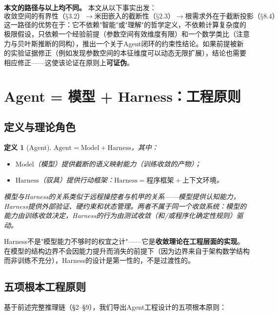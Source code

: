 \documentclass[11pt,a4paper]{ctexart}
\newtheorem{definition}[theorem]{定义}
\begin{document}
\textbf{本文的路径与以上均不同。} 本文从以下事实出发：
\[
\text{收敛空间的有界性（§3.2）} \longrightarrow \text{米田嵌入的截断性（§2.3）} \longrightarrow \text{根需求外在于截断投影（§8.4）}
\]
这一路径的优势在于：它不依赖"智能"或"理解"的哲学定义，不依赖计算复杂度的极限假设，只依赖一个经验前提（参数空间有效维度有限）和一个数学类比（注意力与贝叶斯推断的同构），推出一个关于Agent闭环的约束性结论。如果前提被新的实验证据修正（例如发现参数空间的本征维度可以动态无限扩展），结论也需要相应修正——这使该论证在原则上\textbf{可证伪}。


\section{Agent = 模型 + Harness：工程原则}

\subsection{定义与理论角色}

\begin{definition}[Agent]
    $\mathrm{Agent} = \mathrm{Model} + \mathrm{Harness}$，其中：
    \begin{itemize}
        \item $\mathrm{Model}$（模型）提供截断的语义映射能力（训练收敛的产物）；
        \item $\mathrm{Harness}$（驭具）提供行动框架：$\mathrm{Harness} = \mathrm{程序框架} + \mathrm{上下文环境}$。
    \end{itemize}
    模型与Harness的关系类似于远程操控者与机甲的关系——模型提供认知能力，Harness提供外部验证、硬约束和状态管理。两者不属于同一个收敛系统：模型的能力由训练收敛决定，Harness的行为由测试收敛（和/或程序化确定性规则）驱动。
\end{definition}

Harness不是"模型能力不够时的权宜之计"——它是\textbf{收敛理论在工程层面的实现}。在模型的结构边界不会因能力提升而消失的前提下（因为边界来自于架构数学结构而非训练不充分），Harness的设计是第一性的，不是过渡性的。

\subsection{五项根本工程原则}

基于前述完整推理链（§2--§9），我们导出Agent工程设计的五项根本原则：
\end{document}
